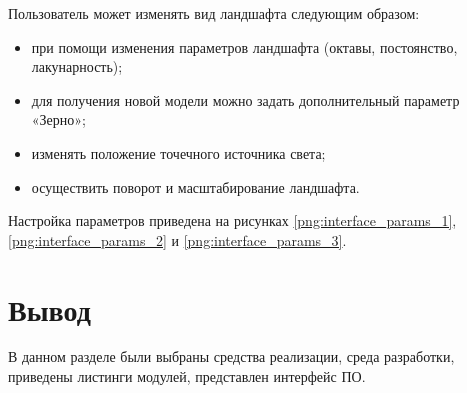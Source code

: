Пользователь может изменять вид ландшафта следующим образом:
\begin{itemize}
	\item при помощи изменения параметров ландшафта (октавы, постоянство, лакунарность);
	\item для получения новой модели можно задать дополнительный параметр «Зерно»;
	\item изменять положение точечного источника света;
	\item осуществить поворот и масштабирование ландшафта.
\end{itemize}
	
Настройка параметров приведена на рисунках \ref{png:interface_params_1}, \ref{png:interface_params_2} и \ref{png:interface_params_3}.

\begin{figure}[H]
\end{figure}

\begin{figure}[H]
\end{figure}

\begin{figure}[H]
\end{figure}

	
\section{Вывод}
В данном разделе были выбраны средства реализации, среда разработки, приведены листинги модулей, представлен интерфейс ПО.